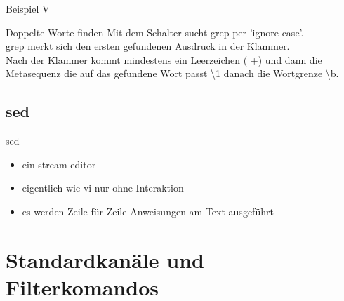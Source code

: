 \documentclass[aspectratio=43]{beamer}
\begin{document}
\begin{frame} 
	\begin{exampleblock}{Beispiel V}
	\\
	\end{exampleblock}

	\begin{block}{Doppelte Worte finden} 
Mit dem Schalter  sucht grep per 'ignore case'.\\
grep merkt sich den ersten gefundenen Ausdruck in der Klammer.\\
Nach der Klammer kommt  mindestens ein Leerzeichen ( +) und dann die Metasequenz die auf das gefundene Wort passt \textbackslash 1 danach die Wortgrenze \textbackslash b.
	\end{block}	
\end{frame}

\subsection{sed}
\begin{frame} 

	\begin{block}{sed} 
	\begin{itemize}
	\item ein stream editor
	\item eigentlich wie vi nur ohne Interaktion
	\item es werden Zeile für Zeile Anweisungen am Text ausgeführt 
	\end{itemize}
	\end{block}

\end{frame}

\section{Standardkanäle und Filterkomandos}
\end{document}
